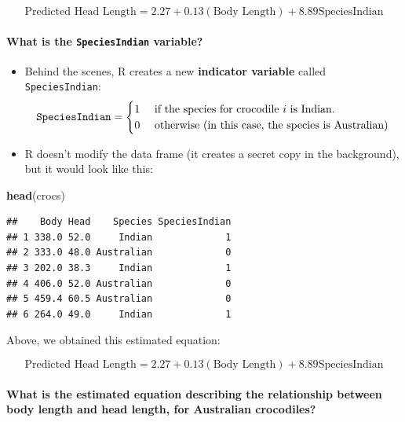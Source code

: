\documentclass[14pt]{extarticle}
\newenvironment{Shaded}{\begin{snugshade}}{\end{snugshade}}
\newcommand{\KeywordTok}[1]{\textcolor[rgb]{0.13,0.29,0.53}{\textbf{#1}}}
\newcommand{\NormalTok}[1]{#1}
\let\oldparagraph\paragraph
\renewcommand{\paragraph}[1]{\oldparagraph{#1}\mbox{}}
\begin{document}
\[\text{Predicted Head Length} = 2.27 + 0.13 (\text{Body Length}) + 8.89 \text{SpeciesIndian}\]

\newpage

\paragraph{\texorpdfstring{What is the \texttt{SpeciesIndian}
variable?}{What is the SpeciesIndian variable?}}\label{what-is-the-speciesindian-variable}

\begin{itemize}
\item
  Behind the scenes, R creates a new \textbf{indicator variable} called
  \texttt{SpeciesIndian}:
  \[\text{{\tt SpeciesIndian}} = \begin{cases} 1 & \text{ if the species for crocodile $i$ is Indian.} \\
  0 & \text{ otherwise (in this case, the species is Australian)} \end{cases}
  \]
\item
  R doesn't modify the data frame (it creates a secret copy in the
  background), but it would look like this:
\end{itemize}

\begin{Shaded}
\begin{Highlighting}[]
\KeywordTok{head}\NormalTok{(crocs)}
\end{Highlighting}
\end{Shaded}

\begin{verbatim}
##    Body Head    Species SpeciesIndian
## 1 338.0 52.0     Indian             1
## 2 333.0 48.0 Australian             0
## 3 202.0 38.3     Indian             1
## 4 406.0 52.0 Australian             0
## 5 459.4 60.5 Australian             0
## 6 264.0 49.0     Indian             1
\end{verbatim}

Above, we obtained this estimated equation:

\[\text{Predicted Head Length} = 2.27 + 0.13 (\text{Body Length}) + 8.89 \text{SpeciesIndian}\]

\paragraph{What is the estimated equation describing the relationship
between body length and head length, for Australian
crocodiles?}\label{what-is-the-estimated-equation-describing-the-relationship-between-body-length-and-head-length-for-australian-crocodiles}
\end{document}
